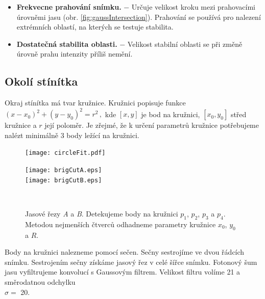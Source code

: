   \begin{itemize}
   \item \textbf{Frekvecne prahování snímku.} $-$ Určuje velikost kroku mezi prahovacími úrovněmi jasu (obr. \ref{fig:gaussIntersection}). Prahování se používá pro nalezení extrémních oblastí, na kterých se testuje stabilita.
   
   \item \textbf{Dostatečná stabilita oblasti.} $-$ Velikost stabilní oblasti se při změně úrovně prahu intenzity příliš nemění. 
   \end{itemize}
   
\subsection{Okolí stínítka}
\label{sec:okoliStinitka}
	Okraj stínítka má tvar kružnice. Kružnici popisuje funkce $\left(x-x_0\right)^2 + \left(y-y_0\right)^2 = r^2\,,$ kde $\left[x,y\right]$ je bod na kružnici, $\left[x_0,y_0\right]$ střed kružnice a $r$ její poloměr. Je zřejmé, že k určení parametrů kružnice potřebujeme nalézt minimálně 3 body ležící na kružnici. 

\begin{figure}[h!]
    \centering
    \begin{minipage}[c]{0.48\textwidth}
        \centering\texttt{[image: circleFit.pdf]}
    \end{minipage}
    \begin{minipage}[c]{0.48\textwidth}
        \centering\texttt{[image: brigCutA.eps]}\\
        
        \centering\texttt{[image: brigCutB.eps]}
    \end{minipage}
    \\
        \caption[Detekce okolí stínítka.]{Jasové řezy \textit{A} a \textit{B}. Detekujeme body na kružnici $p_1$, $p_2$, $p_3$ a $p_4$. Metodou nejmenších čtverců odhadneme parametry kružnice $x_0$, $y_0$ a $R$.}
        \label{fig:CircleFit}
\end{figure}

Body na kružnici nalezneme pomocí sečen. Sečny sestrojíme ve dvou řádcích snímku. %
Sestrojením sečny získáme jasový řez v celé šířce snímku. Fotonový šum jasu vyfiltrujeme konvolucí s Gaussovým filtrem. Velikost filtru volíme \SI{21}{\px} a směrodatnou odchylku\\ $\sigma = $ \SI{20}{\px}. 

